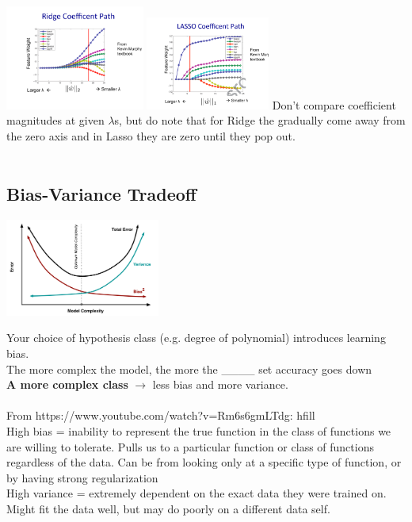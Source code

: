 \includegraphics[width=1.8in]{figures/lambda_with_w2.pdf}  \includegraphics[width=1.6in]{figures/lambda_with_w1.pdf}
Don't compare coefficient magnitudes at given $\lambda$s, 
but do note that for Ridge the gradually come away from the zero axis and in Lasso they are zero until they pop out.   \hfill \\ \hfill \\

\subsection{Bias-Variance Tradeoff}
\includegraphics[width=2.0in]{figures/biasvariance.png} 

Your choice of hypothesis class (e.g. degree of polynomial) introduces learning bias.  \hfill \\
The more complex the model, the more the \_\_\_\_ set accuracy goes down  \hfill \\  %
\textbf{A more complex class } $\rightarrow$ less bias and more variance.   \hfill \\ \hfill \\

From https://www.youtube.com/watch?v=Rm6s6gmLTdg: hfill \\
High bias = inability to represent the true function in the class of functions we are willing to tolerate.
Pulls us to a particular function or class of functions regardless of the data.
Can be from looking only at a specific type of function, or by having strong regularization  \hfill \\
High variance = extremely dependent on the exact data they were trained on.
Might fit the data well, but may do poorly on a different data self.  \hfill \\


